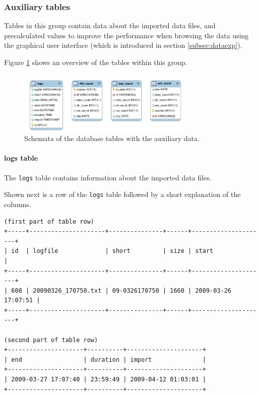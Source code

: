 \subsubsection{Auxiliary tables}
\label{subsubsec:auxiliary_tables}

Tables in this group contain data about the imported data files, and precalculated values to improve the performance when browsing the data using the graphical user interface (which is introduced in section \ref{subsec:dataexp}).

Figure \ref{fig:auxiliary_tables} shows an overview of the tables within this group. 


\begin{figure}[htpb]
\begin{center}
  \includegraphics[width=0.75\textwidth]{assets/pdf/auxiliary_tables_schema.pdf}
  \caption[Schema of database tables with system member data]{Schemata of the database tables with the auxiliary data.}
  \label{fig:auxiliary_tables}
\end{center}
\end{figure}

\paragraph{logs table}
\label{para:logs_table} 

The \lstinline|logs| table contains information about the imported data files.

Shown next is a row of the \lstinline|logs| table followed by a short explanation of the columns.

\codescript
{}
\begin{lstlisting}[frame=none]
(first part of table row)
+-----+---------------------+---------------+------+---------------------+
| id  | logfile             | short         | size | start               |
+-----+---------------------+---------------+------+---------------------+
| 608 | 20090326_170750.txt | 09-0326170750 | 1660 | 2009-03-26 17:07:51 |
+-----+---------------------+---------------+------+---------------------+

(second part of table row)
+---------------------+----------+---------------------+
| end                 | duration | import              |
+---------------------+----------+---------------------+
| 2009-03-27 17:07:40 | 23:59:49 | 2009-04-12 01:03:01 | 
+---------------------+----------+---------------------+

\end{lstlisting}

